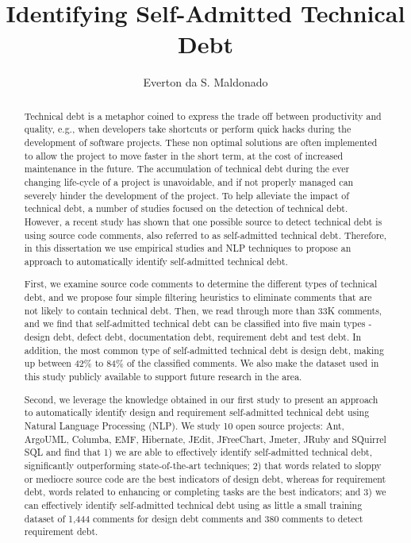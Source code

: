 \documentclass[12pt]{report}
\author{Everton da S. Maldonado}
\title {Identifying Self-Admitted Technical Debt}
\newcommand{\SATD}{self-admitted technical debt\xspace}
\begin{document}
\begin{abstract}

Technical debt is a metaphor coined to express the trade off between productivity and quality, e.g., when developers take shortcuts or perform quick hacks during the development of software projects. These non optimal solutions are often implemented to allow the project to move faster in the short term, at the cost of increased maintenance in the future. The accumulation of technical debt during the ever changing life-cycle of a project is unavoidable, and if not properly managed can severely hinder the development of the project. To help alleviate the impact of technical debt, a number of studies focused on the detection of technical debt. However, a recent study has shown that one possible source to detect technical debt is using source code comments, also referred to as self-admitted technical debt. Therefore, in this dissertation we use empirical studies and NLP techniques to propose an approach to automatically identify \SATD. 

First, we examine source code comments to determine the different types of technical debt, and we propose four simple filtering heuristics to eliminate comments that are not likely to contain technical debt. Then, we read through more than 33K comments, and we find that self-admitted technical debt can be classified into five main types - design debt, defect debt, documentation debt, requirement debt and test debt. In addition, the  most common type of self-admitted technical debt is design debt, making up between 42\% to 84\% of the classified comments. We also make the dataset used in this study publicly available to support future research in the area. 

Second, we leverage the knowledge obtained in our first study to present an approach to automatically identify design and requirement self-admitted technical debt using Natural Language Processing (NLP). We study 10 open source projects: Ant, ArgoUML, Columba, EMF, Hibernate, JEdit, JFreeChart, Jmeter, JRuby and SQuirrel SQL and find that 1) we are able to effectively identify self-admitted technical debt, significantly outperforming state-of-the-art techniques; 2) that words related to sloppy or mediocre source code are the best indicators of design debt, whereas for requirement debt, words related to enhancing or completing tasks are the best indicators; and 3) we can effectively identify self-admitted technical debt using as little a small training dataset of 1,444 comments for design debt comments and 380 comments to detect requirement debt.

\end{abstract}
\end{document}
